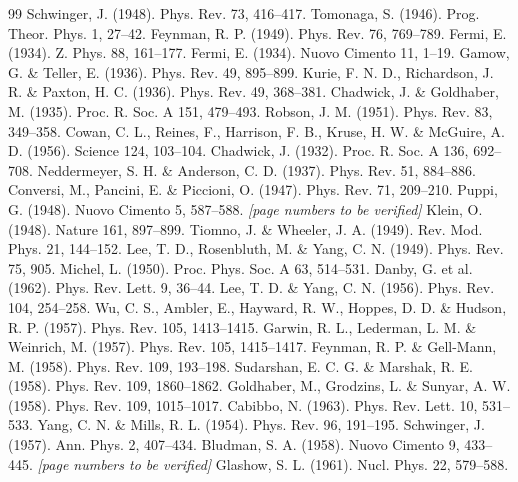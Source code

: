 \begin{thebibliography}{99}
 Schwinger, J. (1948). Phys. Rev. 73, 416–417.
 Tomonaga, S. (1946). Prog. Theor. Phys. 1, 27–42.
 Feynman, R. P. (1949). Phys. Rev. 76, 769–789.
 Fermi, E. (1934). Z. Phys. 88, 161–177.
 Fermi, E. (1934). Nuovo Cimento 11, 1–19.
 Gamow, G. \& Teller, E. (1936). Phys. Rev. 49, 895–899.
 Kurie, F. N. D., Richardson, J. R. \& Paxton, H. C. (1936). Phys. Rev. 49, 368–381.
 Chadwick, J. \& Goldhaber, M. (1935). Proc. R. Soc. A 151, 479–493.
 Robson, J. M. (1951). Phys. Rev. 83, 349–358.
 Cowan, C. L., Reines, F., Harrison, F. B., Kruse, H. W. \& McGuire, A. D. (1956). Science 124, 103–104.
 Chadwick, J. (1932). Proc. R. Soc. A 136, 692–708.
 Neddermeyer, S. H. \& Anderson, C. D. (1937). Phys. Rev. 51, 884–886.
 Conversi, M., Pancini, E. \& Piccioni, O. (1947). Phys. Rev. 71, 209–210.
 Puppi, G. (1948). Nuovo Cimento 5, 587–588. \textit{[page numbers to be verified]}
 Klein, O. (1948). Nature 161, 897–899.
 Tiomno, J. \& Wheeler, J. A. (1949). Rev. Mod. Phys. 21, 144–152.
 Lee, T. D., Rosenbluth, M. \& Yang, C. N. (1949). Phys. Rev. 75, 905.
 Michel, L. (1950). Proc. Phys. Soc. A 63, 514–531.
 Danby, G. et al. (1962). Phys. Rev. Lett. 9, 36–44.
 Lee, T. D. \& Yang, C. N. (1956). Phys. Rev. 104, 254–258.
 Wu, C. S., Ambler, E., Hayward, R. W., Hoppes, D. D. \& Hudson, R. P. (1957). Phys. Rev. 105, 1413–1415.
 Garwin, R. L., Lederman, L. M. \& Weinrich, M. (1957). Phys. Rev. 105, 1415–1417.
 Feynman, R. P. \& Gell-Mann, M. (1958). Phys. Rev. 109, 193–198.
 Sudarshan, E. C. G. \& Marshak, R. E. (1958). Phys. Rev. 109, 1860–1862.
 Goldhaber, M., Grodzins, L. \& Sunyar, A. W. (1958). Phys. Rev. 109, 1015–1017.
 Cabibbo, N. (1963). Phys. Rev. Lett. 10, 531–533.
 Yang, C. N. \& Mills, R. L. (1954). Phys. Rev. 96, 191–195.
 Schwinger, J. (1957). Ann. Phys. 2, 407–434.
 Bludman, S. A. (1958). Nuovo Cimento 9, 433–445. \textit{[page numbers to be verified]}
 Glashow, S. L. (1961). Nucl. Phys. 22, 579–588.

\end{thebibliography}
